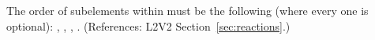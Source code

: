 The order of subelements within \Reaction must be the following
(where every one is optional): ,
, ,
.  (References: L2V2
Section~\ref{sec:reactions}.)
